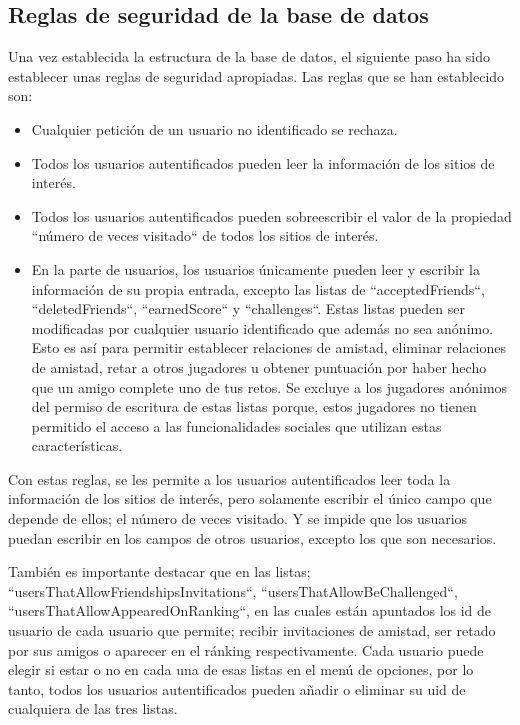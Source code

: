 \subsection{Reglas de seguridad de la base de datos}
Una vez establecida la estructura de la base de datos, el siguiente paso ha sido establecer unas reglas de seguridad apropiadas. Las reglas que se han establecido son:
\begin{itemize}
\item Cualquier petición de un usuario no identificado se rechaza.
\item Todos los usuarios autentificados pueden leer la información de los sitios de interés.
\item Todos los usuarios autentificados pueden sobreescribir el valor de la propiedad ``número de veces visitado`` de todos los sitios de interés.
\item En la parte de usuarios, los usuarios únicamente pueden leer y escribir la información de su propia entrada, excepto las listas de ``acceptedFriends``, ``deletedFriends``, ``earnedScore`` y ``challenges``. Estas listas pueden ser modificadas por cualquier usuario identificado que además no sea anónimo. Esto es así para permitir establecer relaciones de amistad, eliminar relaciones de amistad, retar a otros jugadores u obtener puntuación por haber hecho que un amigo complete uno de tus retos. Se excluye a los jugadores anónimos del permiso de escritura de estas listas porque, estos jugadores no tienen permitido el acceso a las funcionalidades sociales que utilizan estas características. 

\end{itemize}
Con estas reglas, se les permite a los usuarios autentificados leer toda la información de los sitios de interés, pero solamente escribir el único campo que depende de ellos; el número de veces visitado. Y se impide que los usuarios puedan escribir en los campos de otros usuarios, excepto los que son necesarios.

También es importante destacar que en las listas; ``usersThatAllowFriendshipsInvitations``, ``usersThatAllowBeChallenged``, ``usersThatAllowAppearedOnRanking``, en las cuales están apuntados los id de usuario de cada usuario que permite; recibir invitaciones de amistad, ser retado por sus amigos o aparecer en el ránking respectivamente. Cada usuario puede elegir si estar o no en cada una de esas listas en el menú de opciones, por lo tanto, todos los usuarios autentificados pueden añadir o eliminar su uid de cualquiera de las tres listas.

